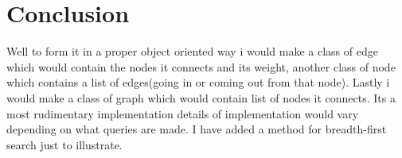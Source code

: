 \documentclass[11pt]{article}            %
\begin{document}
\section{Conclusion}  
	Well to form it in a proper object oriented way i would make a class of edge which would contain the nodes it connects and its weight, another class of node which contains a list of edges(going in or coming out from that node). Lastly i would make a class of graph which would contain list of nodes it connects.
Its a most rudimentary implementation details of implementation would vary depending on what queries are made.  I have added a method for breadth-first search just to illustrate.

 
\end{document}
